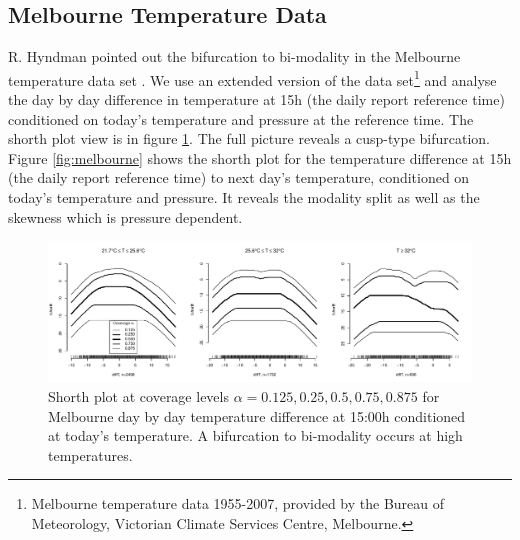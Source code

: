 \documentclass[dvips,12pt,a4paper,twoside]{amsart}
\begin{document}
\subsection{Melbourne Temperature Data}
%
R. Hyndman pointed out the bifurcation to bi-modality in the Melbourne temperature data set \cite{Hyndman1996Estimating-and-}. We use an extended version of the data set\footnote{Melbourne temperature data 1955-2007, provided by the Bureau of Meteorology, Victorian Climate Services Centre, Melbourne.} and analyse the day by day difference in temperature   at 15h (the daily report reference time) conditioned on today's temperature and pressure at the reference time.  The shorth plot view is in figure \ref{fig:melbournet}. The full picture reveals a cusp-type bifurcation. Figure \ref{fig:melbourne} shows the shorth plot for the temperature difference at 15h (the daily report reference time) to next day's temperature, conditioned on today's temperature and pressure. It reveals the modality split as well as the skewness which is pressure dependent.
\begin{figure}[htb]
\includegraphics[width=\linewidth]{TheShorthPlot-MelbourneT}
\caption{Shorth plot at coverage levels $\alpha =0.125,0.25,0.5,0.75,  0.875$ for Melbourne day by day temperature difference at 15:00h conditioned at today's temperature. 
A bifurcation to bi-modality occurs at high temperatures.}\label{fig:melbournet}\end{figure}
\end{document}
